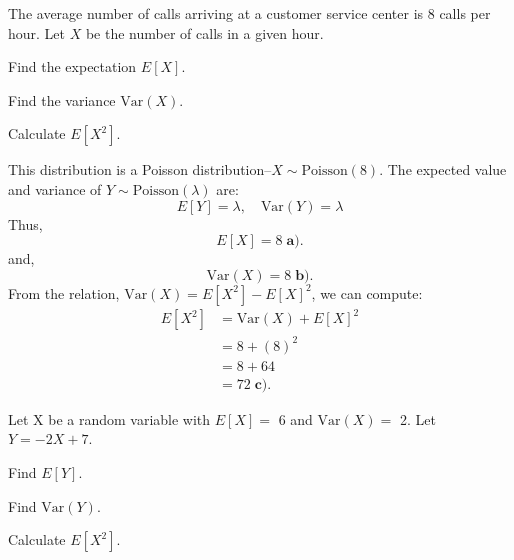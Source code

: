 \documentclass[a4paper, 10pt]{article}
\begin{document}
\begin{problem}
The average number of calls arriving at a customer service center is 8 calls per hour.
Let \( X \) be the number of calls in a given hour.
\begin{subproblems}
    \item Find the expectation \( E[X] \).
    \item Find the variance \( \text{Var}(X) \).
    \item Calculate \( E[X^2] \).
\end{subproblems}
\end{problem}

\begin{solution}
This distribution is a Poisson distribution--\( X \sim \text{Poisson}(8) \).
The expected value and variance of \( Y \sim \text{Poisson}(\lambda) \) are:
\[
    E[Y] = \lambda, \quad \text{Var}(Y) = \lambda
\]
Thus,
\[
    E[X] = \boxed{8} \; \textbf{a).}
\]
and,
\[
    \text{Var}(X) = \boxed{8} \; \textbf{b).}
\]
From the relation, \( \text{Var}(X) = E[X^2] - E[X]^2 \), we can compute:
\begin{align*}
    E[X^2] &= \text{Var}(X) + E[X]^2 \\
    &= 8 + (8)^2 \\
    &= 8 + 64 \\
    &= \boxed{72} \; \textbf{c).}
\end{align*}
\end{solution}


\begin{problem}
Let X be a random variable with \( E[X] = \) 6 and \( \text{Var}(X) = \) 2.
Let \( Y = -2X + 7 \).
\begin{subproblems}
    \item Find \( E[Y] \).
    \item Find \( \text{Var}(Y) \).
    \item Calculate \( E[X^2] \).
\end{subproblems}
\end{problem}
\end{document}
